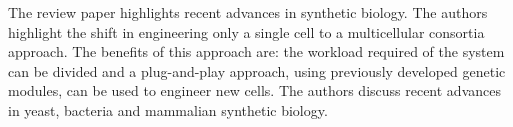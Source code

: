 \documentclass[float=false, crop=false]{standalone}
\begin{document}
	The review paper \cite{Bacchus2013} highlights recent advances in synthetic biology. The authors highlight the shift in engineering only a single cell to a multicellular consortia approach. The benefits of this approach are: the workload required of the system can be divided and a plug-and-play approach, using previously developed genetic modules, can be used to engineer new cells. The authors discuss recent advances in yeast, bacteria and mammalian synthetic biology.

	\ifstandalone
			
		
	\fi
\end{document}
